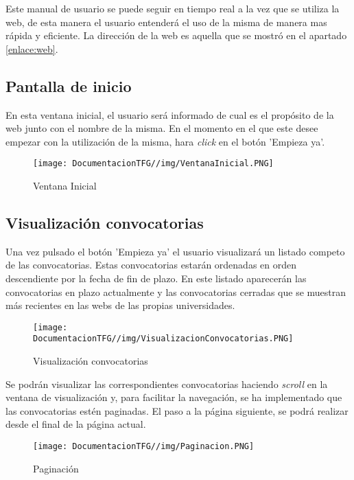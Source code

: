 Este manual de usuario se puede seguir en tiempo real a la vez que se utiliza la web, de esta manera el usuario entenderá el uso de la misma de manera mas rápida y eficiente. La dirección de la web es aquella que se mostró en el apartado \ref{enlace:web}.

\subsection{Pantalla de inicio}
En esta ventana inicial, el usuario será informado de cual es el propósito de la web junto con el nombre de la misma. En el momento en el que este desee empezar con la utilización de la misma, hara \textit{click} en el botón 'Empieza ya'.
\begin{figure}[H]
    \centering
    \texttt{[image: DocumentacionTFG//img/VentanaInicial.PNG]}
    \caption{Ventana Inicial}
    \label{fig:ventana-inicial}
\end{figure}

\subsection{Visualización convocatorias}
Una vez pulsado el botón 'Empieza ya' el usuario visualizará un listado competo de las convocatorias. Estas convocatorias estarán ordenadas en orden descendiente por la fecha de fin de plazo. En este listado aparecerán las convocatorias en plazo actualmente y las convocatorias cerradas que se muestran más recientes en las webs de las propias universidades.

\begin{figure}[H]
    \centering
    \texttt{[image: DocumentacionTFG//img/VisualizacionConvocatorias.PNG]}
    \caption{Visualización convocatorias}
    \label{fig:visualizacion-convocatorias}
\end{figure}

Se podrán visualizar las correspondientes convocatorias haciendo \textit{scroll} en la ventana de visualización y, para facilitar la navegación, se ha implementado que las convocatorias estén paginadas. El paso a la página siguiente, se podrá realizar desde el final de la página actual.

\begin{figure}[H]
    \centering
    \texttt{[image: DocumentacionTFG//img/Paginacion.PNG]}
    \caption{Paginación}
    \label{fig:paginacion}
\end{figure}

